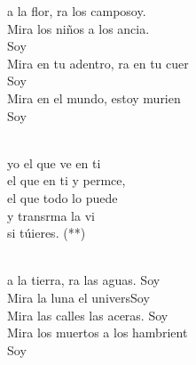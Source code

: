 \documentclass[12pt]{article}
\begin{document}
\begin{multicols*}{2}
\begin{cancion}[Soy yo][Almudena]%
	a la flor, ra los camposoy.\\
	Mira los niños a los ancia. \\
	Soy \\
	Mira en tu adentro, ra en tu cuer\\
	Soy \\
	Mira en el mundo,  estoy murien \\
	Soy \\\jump\\
	\begin{chorus}%
	 yo el que ve en ti\\
	el que  en ti y permce,\\
el que todo lo puede \\
	y transrma la vi\\
	si túieres. (**)\\
	\end{chorus}%
	\jump\\
	a la tierra, ra las aguas. Soy\\
	Mira la luna el universSoy \\
	Mira las calles las aceras. Soy \\
	Mira los muertos a los hambrient\\
	Soy \\
\end{cancion}%


\end{multicols*}
\end{document}

